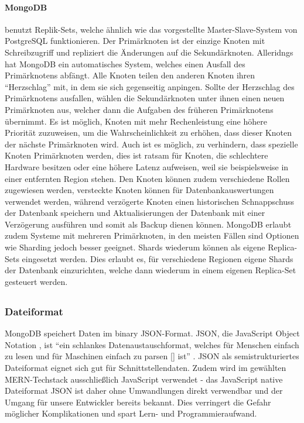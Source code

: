 \paragraph{MongoDB}
benutzt Replik-Sets, welche ähnlich wie das vorgestellte Master-Slave-System von PostgreSQL funktionieren. Der Primärknoten ist der einzige Knoten mit Schreibzugriff und repliziert die Änderungen auf die Sekundärknoten. Alleridngs hat MongoDB ein automatisches System, welches einen Ausfall des Primärknotens abfängt. Alle Knoten teilen den anderen Knoten ihren \enquote{Herzschlag} mit, in dem sie sich gegenseitig anpingen. Sollte der Herzschlag des Primärknotens ausfallen, wählen die Sekundärknoten unter ihnen einen neuen Primärknoten aus, welcher dann die Aufgaben des früheren Primärknotens übernimmt. Es ist möglich, Knoten mit mehr Rechenleistung eine höhere Priorität zuzuweisen, um die Wahrscheinlichkeit zu erhöhen, dass dieser Knoten der nächste Primärknoten wird. Auch ist es möglich, zu verhindern, dass spezielle Knoten Primärknoten werden, dies ist ratsam für Knoten, die schlechtere Hardware besitzen oder eine höhere Latenz aufweisen, weil sie beispielsweise in einer entfernten Region stehen. Den Knoten können zudem verschiedene Rollen zugewiesen werden, versteckte Knoten können für Datenbankauswertungen verwendet werden, während verzögerte Knoten einen historischen Schnappschuss der Datenbank speichern und Aktualisierungen der Datenbank mit einer Verzögerung ausführen und somit als Backup dienen können. \cite{MG10}\cite{MG11}\cite{MG12}\cite{MG13} MongoDB erlaubt zudem Systeme mit mehreren Primärknoten, in den meisten Fällen sind Optionen wie Sharding jedoch besser geeignet. \cite{MG14}
Shards wiederum können als eigene Replica-Sets eingesetzt werden. Dies erlaubt es, für verschiedene Regionen eigene Shards der Datenbank einzurichten, welche dann wiederum in einem eigenen Replica-Set gesteuert werden.



\subsection{}

\subsubsection{Dateiformat}
MongoDB speichert Daten im \glqq binary JSON\grqq -Format. JSON, die \glqq JavaScript Object Notation \grqq, ist \enquote{ein schlankes Datenaustauschformat, welches für Menschen einfach zu lesen und für Maschinen einfach zu parsen [] ist} \cite{JSON1}. JSON als semistrukturiertes Dateiformat eignet sich gut für Schnittstellendaten. Zudem wird im gewählten MERN-Techstack ausschließlich JavaScript verwendet - das JavaScript native Dateiformat JSON ist daher ohne Umwandlungen direkt verwendbar und der Umgang für unsere Entwickler bereits bekannt. Dies verringert die Gefahr möglicher Komplikationen und spart Lern- und Programmieraufwand.

